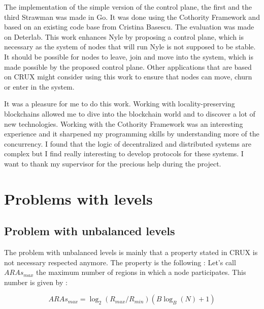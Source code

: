 \documentclass[a4paper,11pt,oneside]{report}
\begin{document}

The implementation of the simple version of the control plane, the first and
the third Strawman was made in Go. It was done using the Cothority Framework
and based on an existing code base from Cristina Basescu. The evaluation was
made on Deterlab. This work enhances Nyle by proposing a control plane, which
is necessary as the system of nodes that will run Nyle is not supposed to be stable. It should be possible for nodes to leave, join and move into the
system, which is made possible by the proposed control plane. Other
applications that are based on CRUX \cite{Basescu2014} might consider using
this work to ensure that nodes can move, churn or enter in the system.

It was a pleasure for me to do this work. Working with locality-preserving
blockchains allowed me to dive into the blockchain world and to discover a lot
of new technologies. Working with the Cothority Framework was an interesting
experience and it sharpened my programming skills by understanding more of the
concurrency. I found that the logic of decentralized and distributed systems
are complex but I find really interesting to develop protocols for these
systems. I want to thank my supervisor for the precious help during the project.


\cleardoublepage {} {}
\printbibliography


\appendix %

\chapter{Problems with levels}

\section{Problem with unbalanced levels } \label{app:unbalanced-levels}
The problem with unbalanced levels is mainly that a property stated in CRUX \cite{Basescu2014} is not necessary respected anymore. The property is the following : Let's call $ARAs_{max}$ the maximum number of regions in which a node participates. This number is given by : 

\begin{equation} \label{eq:ARAmax}
ARAs_{max} = \log_2(R_{max}/R_{min}) (B \log_B(N)+1)
\end{equation}
\end{document}

